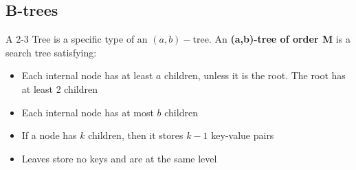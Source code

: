 \documentclass{report}
\begin{document}
\subsection{B-trees}
A 2-3 Tree is a specific type of an $(a,b)-$tree. An \textbf{(a,b)-tree of order M} is a search tree satisfying:
\begin{itemize}
\item Each internal node has at least $a$ children, unless it is the root. The root has at least 2 children
\item Each internal node has at most $b$ children
\item If a node has $k$ children, then it stores $k-1$ key-value pairs
\item Leaves store no keys and are at the same level
\end{itemize}
\end{document}
